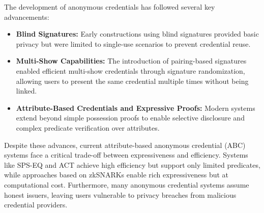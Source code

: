 The development of anonymous credentials has followed several key advancements:
\begin{itemize}
    \item \textbf{Blind Signatures:} Early constructions using blind signatures provided basic privacy but were limited to single-use scenarios to prevent credential reuse.
    
    \item \textbf{Multi-Show Capabilities:} The introduction of pairing-based signatures \cite{cimato_signature_2003, hutchison_constant-size_2006} enabled efficient multi-show credentials through signature randomization, allowing users to present the same credential multiple times without being linked.
    
    \item \textbf{Attribute-Based Credentials and Expressive Proofs:} Modern systems extend beyond simple possession proofs to enable selective disclosure and complex predicate verification over attributes.
\end{itemize}

Despite these advances, current attribute-based anonymous credential (ABC) systems face a critical trade-off between expressiveness and efficiency. Systems like SPS-EQ \cite{fuchsbauer_structure-preserving_2019, hanaoka_improved_2022} and ACT \cite{guo_anonymous_2023} achieve high efficiency but support only limited predicates, while approaches based on zkSNARKs enable rich expressiveness \cite{rosenberg_zk-creds_2022} but at computational cost. Furthermore, many anonymous credential systems assume honest issuers, leaving users vulnerable to privacy breaches from malicious credential providers.


